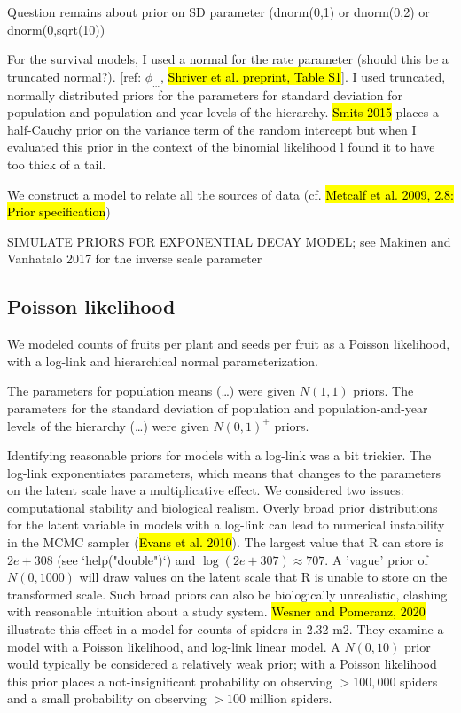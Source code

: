 \documentclass[12pt, oneside, titlepage]{article}   	%
\begin{document}
Question remains about prior on SD parameter (dnorm(0,1) or dnorm(0,2) or dnorm(0,sqrt(10))

For the survival models, I used a normal for the rate parameter (should this be a truncated normal?). [ref: $\phi_{\dots}$, \hl{Shriver et al. preprint, Table S1}]. I used truncated, normally distributed priors for the parameters for standard deviation for population and population-and-year levels of the hierarchy. \hl{Smits 2015} places a half-Cauchy prior on the variance term of the random intercept but when I evaluated this prior in the context of the binomial likelihood l found it to have too thick of a tail.

We construct a model to relate all the sources of data (cf. \hl{Metcalf et al. 2009, 2.8: Prior specification})

SIMULATE PRIORS FOR EXPONENTIAL DECAY MODEL; see Makinen and Vanhatalo 2017 for the inverse scale parameter


\subsection*{Poisson likelihood}

We modeled counts of fruits per plant and seeds per fruit as a Poisson likelihood, with a log-link and hierarchical normal parameterization. 

The parameters for population means (\dots) were given $N(1,1)$ priors. The parameters for the standard deviation of population and population-and-year levels of the hierarchy (\dots) were given $N(0,1)^+$ priors. 

Identifying reasonable priors for models with a log-link was a bit trickier. The log-link exponentiates parameters, which means that changes to the parameters on the latent scale have a multiplicative effect. We considered two issues: computational stability and biological realism. Overly broad prior distributions for the latent variable in models with a log-link can lead to numerical instability in the MCMC sampler (\hl{Evans et al. 2010}). The largest value that R can store is $2e+308$ (see `help("double")`) and $\log(2e+307) \approx 707$. A 'vague' prior of $N(0,1000)$ will draw values on the latent scale that R is unable to store on the transformed scale. Such broad priors can also be biologically unrealistic, clashing with reasonable intuition about a study system. \hl{Wesner and Pomeranz, 2020} illustrate this effect in a model for counts of spiders in 2.32 m2. They examine a model with a Poisson likelihood, and log-link linear model. A $N(0,10)$ prior would typically be considered a relatively weak prior; with a Poisson likelihood this prior places a not-insignificant probability on observing $>100,000$ spiders and a small probability on observing $>100$ million spiders. 
\end{document}
